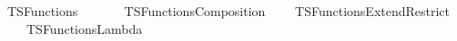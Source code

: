 %
\begin{isabellebody}%
%
%
\isadelimdocument
%
\endisadelimdocument
%
\isatagdocument
%
\isamarkuptrue%
%
\endisatagdocument
{\isafolddocument}%
%
\isadelimdocument
%
\endisadelimdocument
%
\isadelimtheory
%
\endisadelimtheory
%
\isatagtheory
{}\isamarkupfalse%
\ TSFunctions\isanewline
\ \ \isanewline
\ \ \ \ TSFunctions{\isacharunderscore}{\kern0pt}Composition\isanewline
\ \ \ \ TSFunctions{\isacharunderscore}{\kern0pt}Extend{\isacharunderscore}{\kern0pt}Restrict\isanewline
\ \ \ \ TSFunctions{\isacharunderscore}{\kern0pt}Lambda\isanewline
{}\isanewline
\isanewline
\isanewline
{}\isamarkupfalse%
%
\endisatagtheory
{\isafoldtheory}%
%
\isadelimtheory
%
\endisadelimtheory
%
\end{isabellebody}%
\endinput
